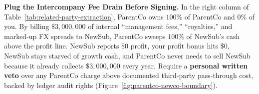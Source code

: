 \begin{trapbox}
\textbf{Plug the Intercompany Fee Drain Before Signing.}
In the right column of Table~\ref{tab:related-party-extraction}, ParentCo owns $100\%$ of ParentCo and $0\%$ of you. By billing $\$3{,}000{,}000$ of internal ``management fees,'' ``royalties,'' and marked-up FX spreads to NewSub, ParentCo sweeps $100\%$ of NewSub's cash above the profit line. NewSub reports $\$0$ profit, your profit bonus hits $\$0$, NewSub stays starved of growth cash, and ParentCo never needs to sell NewSub because it already collects $\$3{,}000{,}000$ every year. Require a \textbf{personal written veto} over any ParentCo charge above documented third-party pass-through cost, backed by ledger audit rights (Figure~\ref{fig:parentco-newco-boundary}).
\end{trapbox}

